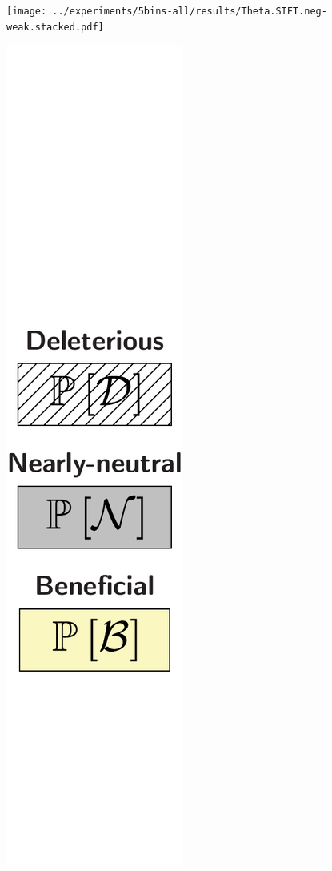 \documentclass{article}
\begin{document}
\begin{center}
\begin{minipage}{0.09\linewidth}
        \end{minipage}
        \begin{minipage}{0.9\linewidth}
            \texttt{[image: ../experiments/5bins-all/results/Theta.SIFT.neg-weak.stacked.pdf]} \\
        \end{minipage}
        \begin{minipage}{0.09\linewidth}
            \includegraphics[width=\linewidth, page=1]{artworks/legend.polycat}

\end{minipage}
\end{center}
\end{document}
